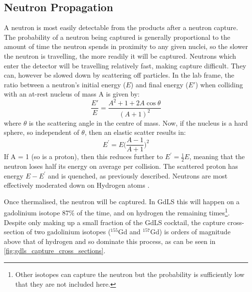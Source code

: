 

\subsection{Neutron Propagation}
\par
A neutron is most easily detectable from the products after a neutron capture.
The probability of a neutron being captured is generally proportional to the amount of time the neutron spends in proximity to any given nuclei, so the slower the neutron is travelling, the more readily it will be captured.
Neutrons which enter the detector will be travelling relatively fast, making capture difficult.
They can, however be slowed down by scattering off particles.
In the lab frame, the ratio between a neutron's initial energy ($E$) and final energy ($E'$) when colliding with an at-rest nucleus of mass A is given by:
\begin{equation}
    \frac{E'}{E} = \frac{A^2 + 1 + 2A\cos{\theta}}{(A + 1)^2}
\end{equation}
where $\theta$ is the scattering angle in the centre of mass.
Now, if the nucleus is a hard sphere, so independent of $\theta$, then an elastic scatter results in:
\begin{equation}
    E^{'} = E\bigg(\frac{A-1}{A+1}\bigg)^{2}
\end{equation}
If A = 1 (so is a proton), then this reduces further to $E^{'} = \frac{1}{2}E$, meaning that the neutron loses half its energy on average per collision.
The scattered proton has energy $E - E^{'}$ and is quenched, as previously described.
Neutrons are most effectively moderated down on Hydrogen atoms \cite{neutron_thermalisation_and_capture_ref}.

\par
Once thermalised, the neutron will be captured.
In GdLS this will happen on a gadolinium isotope 87\% of the time, and on hydrogen the remaining times\footnote{Other isotopes can capture the neutron but the probability is sufficiently low that they are not included here.}.
Despite only making up a small fraction of the GdLS cocktail, the capture cross-section of two gadolinium isotopes (${}^{155}$Gd and ${}^{157}$Gd) is orders of magnitude above that of hydrogen and so dominate this process, as can be seen in \autoref{fig:gdls_capture_cross_sections}.



